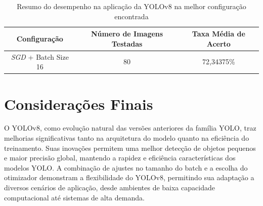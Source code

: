 \begin{table}[!hbt]
    \centering
    \begin{tabular}{|c|c|c|}
        \hline
        \textbf{Configuração} & \textbf{Número de Imagens Testadas} & \textbf{Taxa Média de Acerto} \\ \hline
        \textit{SGD} + Batch Size 16 & 80 & 72,34375\% \\ \hline
    \end{tabular}
    \caption{Resumo do desempenho na aplicação da YOLOv8 na melhor configuração encontrada}
    \label{tab:yolov8-eval}
\end{table}

\section{Considerações Finais} 

O YOLOv8, como evolução natural das versões anteriores da família YOLO, traz melhorias significativas tanto na arquitetura do modelo quanto na eficiência do treinamento. Suas inovações permitem uma melhor detecção de objetos pequenos e maior precisão global, mantendo a rapidez e eficiência características dos modelos YOLO. A combinação de ajustes no tamanho do batch e a escolha do otimizador demonstram a flexibilidade do YOLOv8, permitindo sua adaptação a diversos cenários de aplicação, desde ambientes de baixa capacidade computacional até sistemas de alta demanda.

